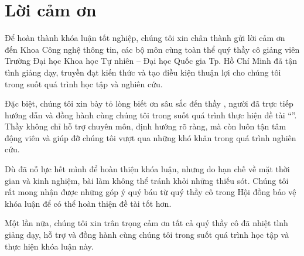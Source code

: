 \chapter*{Lời cảm ơn}

Để hoàn thành khóa luận tốt nghiệp, chúng tôi xin chân thành gửi lời cảm ơn đến Khoa Công nghệ thông tin, các bộ môn cùng toàn thể quý thầy cô giảng viên Trường Đại học Khoa học Tự nhiên -- Đại học Quốc gia Tp. Hồ Chí Minh 
đã tận tình giảng dạy, truyền đạt kiến thức và tạo điều kiện thuận lợi cho chúng tôi trong suốt quá trình học tập và nghiên cứu.

Đặc biệt, chúng tôi xin bày tỏ lòng biết ơn sâu sắc đến thầy \advisorname, người đã trực tiếp hướng dẫn và đồng hành cùng chúng tôi trong suốt quá trình thực hiện đề tài ``\thesisname''. 
Thầy không chỉ hỗ trợ chuyên môn, định hướng rõ ràng, mà còn luôn tận tâm động viên và giúp đỡ chúng tôi vượt qua những khó khăn trong quá trình nghiên cứu.

Dù đã nỗ lực hết mình để hoàn thiện khóa luận, nhưng do hạn chế về mặt thời gian và kinh nghiệm, bài làm không thể tránh khỏi những thiếu sót. 
Chúng tôi rất mong nhận được những góp ý quý báu từ quý thầy cô trong Hội đồng bảo vệ khóa luận để có thể hoàn thiện đề tài tốt hơn.

Một lần nữa, chúng tôi xin trân trọng cảm ơn tất cả quý thầy cô đã nhiệt tình giảng dạy, hỗ trợ và đồng hành cùng chúng tôi trong suốt quá trình học tập và thực hiện khóa luận này.